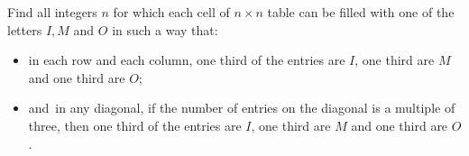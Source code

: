 Find all integers $n$ for which each cell of $n \times n$ table can be filled with one of the letters $I,M$ and $O$ in such a way that:

\begin{itemize}
	\item in each row and each column, one third of the entries are $I$, one third are $M$ and one third are $O$;
	\item and in any diagonal, if the number of entries on the diagonal is a multiple of three, then one third of the entries are $I$, one third are $M$ and one third are $O$.
\end{itemize}
	
